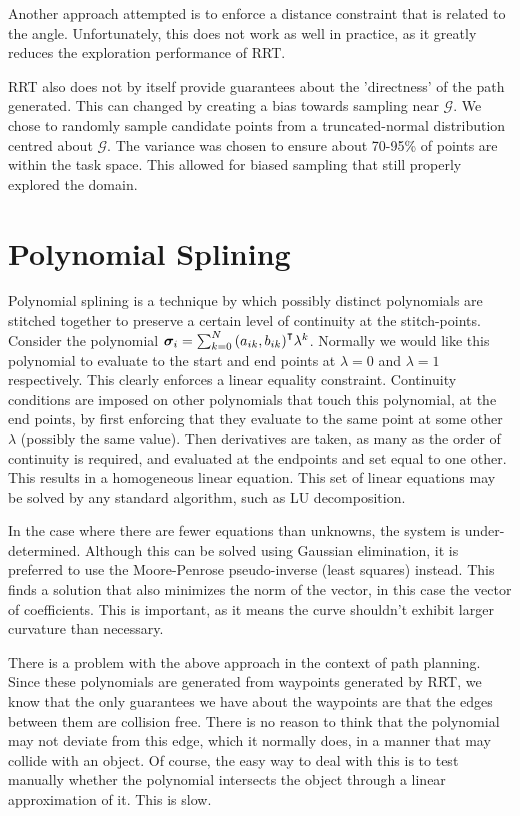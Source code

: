 \documentclass[oneside, 11pt]{book}
\begin{document}
Another approach attempted is to enforce a distance constraint that is related to the angle. Unfortunately, this does not work as well in practice, as it greatly reduces the exploration performance of RRT.

RRT also does not by itself provide guarantees about the 'directness' of the path generated. This can changed by creating a bias towards sampling near $\mathcal{G}$\cite{LaValle06}\cite{Yang14}. We chose to randomly sample candidate points from a truncated-normal distribution centred about $\mathcal{G}$. The variance was chosen to ensure about 70-95\% of points are within the task space. This allowed for biased sampling that still properly explored the domain.

\section{Polynomial Splining}
Polynomial splining is a technique by which possibly distinct polynomials are stitched together to preserve a certain level of continuity at the stitch-points. Consider the polynomial $\bm{\sigma}_i = \sum_{k=0}^N{{(a_{ik},b_{ik})}^{\intercal}\lambda^k}$. Normally we would like this polynomial to evaluate to the start and end points at $\lambda=0$ and $\lambda=1$ respectively. This clearly enforces a linear equality constraint. Continuity conditions are imposed on other polynomials that touch this polynomial, at the end points, by first enforcing that they evaluate to the same point at some other $\lambda$ (possibly the same value). Then derivatives are taken, as many as the order of continuity is required, and evaluated at the endpoints and set equal to one other. This results in a homogeneous linear equation. This set of linear equations may be solved by any standard algorithm, such as LU decomposition.

In the case where there are fewer equations than unknowns, the system is under-determined. Although this can be solved using Gaussian elimination, it is preferred to use the Moore-Penrose pseudo-inverse (least squares) instead. This finds a solution that also minimizes the norm of the vector, in this case the vector of coefficients. This is important, as it means the curve shouldn't exhibit larger curvature than necessary.

There is a problem with the above approach in the context of path planning. Since these polynomials are generated from waypoints generated by RRT, we know that the only guarantees we have about the waypoints are that the edges between them are collision free. There is no reason to think that the polynomial may not deviate from this edge, which it normally does, in a manner that may collide with an object. Of course, the easy way to deal with this is to test manually whether the polynomial intersects the object through a linear approximation of it. This is slow.
\end{document}
